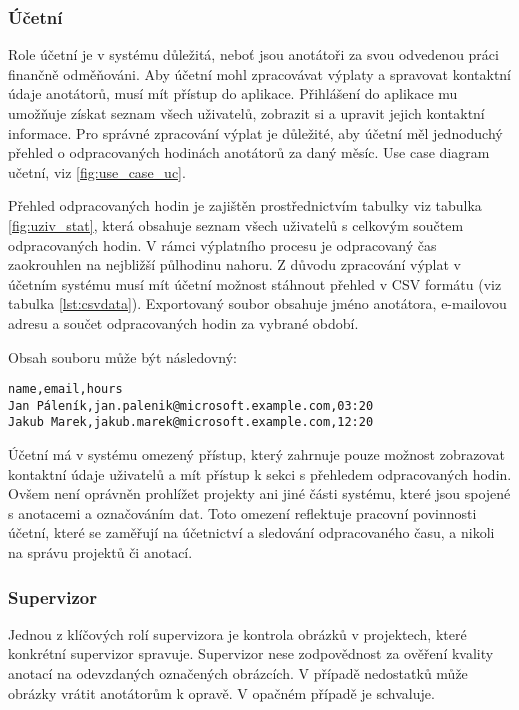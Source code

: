 \subsubsection{Účetní}
Role účetní je v systému důležitá, neboť jsou anotátoři za svou odvedenou práci finančně odměňováni. Aby účetní mohl zpracovávat výplaty a spravovat kontaktní údaje anotátorů, musí mít přístup do aplikace. Přihlášení do aplikace mu umožňuje získat seznam všech uživatelů, zobrazit si a upravit jejich kontaktní informace.
Pro správné zpracování výplat je důležité, aby účetní měl jednoduchý přehled o odpracovaných hodinách anotátorů za daný měsíc. Use case diagram učetní, viz \vref{fig:use_case_uc}.


Přehled odpracovaných hodin je zajištěn prostřednictvím tabulky viz tabulka \vref{fig:uziv_stat}, která obsahuje seznam všech uživatelů s celkovým součtem odpracovaných hodin.
V rámci výplatního procesu je odpracovaný čas zaokrouhlen na nejbližší půlhodinu nahoru. Z důvodu zpracování výplat v účetním systému musí mít účetní možnost stáhnout přehled v CSV formátu (viz tabulka \vref{lst:csvdata}). Exportovaný soubor obsahuje jméno anotátora, e-mailovou adresu a součet odpracovaných hodin za vybrané období. 


Obsah souboru může být následovný:
\begin{lstlisting}[language={}, caption=Exportovaný výpis hodin, label=lst:csvdata]
name,email,hours
Jan Páleník,jan.palenik@microsoft.example.com,03:20
Jakub Marek,jakub.marek@microsoft.example.com,12:20
\end{lstlisting}

Účetní má v systému omezený přístup, který zahrnuje pouze možnost zobrazovat kontaktní údaje uživatelů a mít přístup k sekci s přehledem odpracovaných hodin. Ovšem není oprávněn prohlížet projekty ani jiné části systému, které jsou spojené s anotacemi a označováním dat. Toto omezení reflektuje pracovní 
povinnosti účetní, které se zaměřují na účetnictví a sledování odpracovaného času, a nikoli na správu projektů či anotací. 

\subsubsection{Supervizor}
Jednou z klíčových rolí supervizora je kontrola obrázků v projektech, které konkrétní supervizor spravuje. Supervizor nese zodpovědnost za ověření kvality anotací na odevzdaných označených obrázcích. V případě nedostatků může obrázky vrátit anotátorům k opravě. V opačném případě je schvaluje. 

